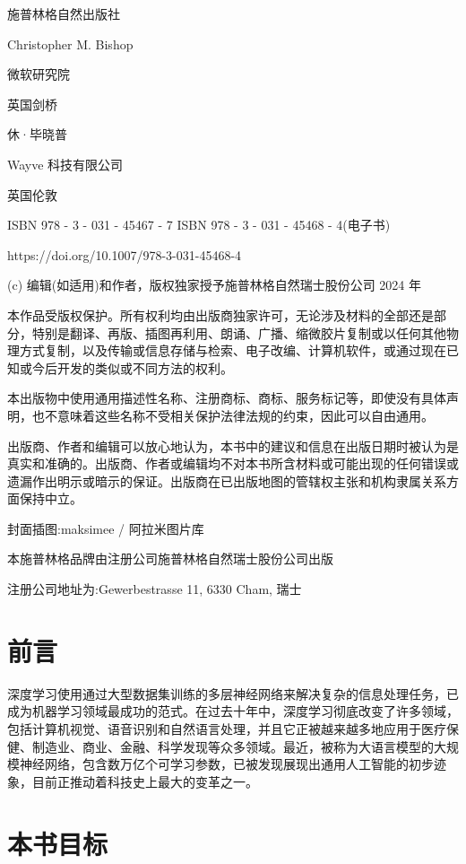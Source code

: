 \documentclass[10pt]{article}
\newcommand{\customfootnote}[1]{
  \let\thefootnote\relax\footnotetext{#1}
}
\begin{document}
\customfootnote{

深度学习

}



施普林格自然出版社

Christopher M. Bishop

微软研究院

英国剑桥

休·毕晓普

Wayve 科技有限公司

英国伦敦

ISBN 978 - 3 - 031 - 45467 - 7 ISBN 978 - 3 - 031 - 45468 - 4(电子书)

https://doi.org/10.1007/978-3-031-45468-4

(c) 编辑(如适用)和作者，版权独家授予施普林格自然瑞士股份公司 2024 年

本作品受版权保护。所有权利均由出版商独家许可，无论涉及材料的全部还是部分，特别是翻译、再版、插图再利用、朗诵、广播、缩微胶片复制或以任何其他物理方式复制，以及传输或信息存储与检索、电子改编、计算机软件，或通过现在已知或今后开发的类似或不同方法的权利。

本出版物中使用通用描述性名称、注册商标、商标、服务标记等，即使没有具体声明，也不意味着这些名称不受相关保护法律法规的约束，因此可以自由通用。

出版商、作者和编辑可以放心地认为，本书中的建议和信息在出版日期时被认为是真实和准确的。出版商、作者或编辑均不对本书所含材料或可能出现的任何错误或遗漏作出明示或暗示的保证。出版商在已出版地图的管辖权主张和机构隶属关系方面保持中立。

封面插图:maksimee / 阿拉米图片库

本施普林格品牌由注册公司施普林格自然瑞士股份公司出版

注册公司地址为:Gewerbestrasse 11, 6330 Cham, 瑞士

\section*{前言}

深度学习使用通过大型数据集训练的多层神经网络来解决复杂的信息处理任务，已成为机器学习领域最成功的范式。在过去十年中，深度学习彻底改变了许多领域，包括计算机视觉、语音识别和自然语言处理，并且它正被越来越多地应用于医疗保健、制造业、商业、金融、科学发现等众多领域。最近，被称为大语言模型的大规模神经网络，包含数万亿个可学习参数，已被发现展现出通用人工智能的初步迹象，目前正推动着科技史上最大的变革之一。

\section*{本书目标}
\end{document}
